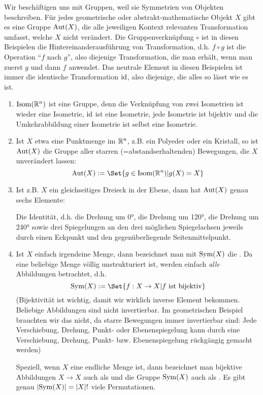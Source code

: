 \begin{example}[Symmetriegruppen]
Wir beschäftigen uns mit Gruppen, weil sie Symmetrien von Objekten beschreiben. Für jedes geometrische oder abstrakt-mathematische Objekt $X$ gibt es eine Gruppe $\operatorname{Aut}(X)$, die alle jeweiligen Kontext relevanten Transformation umfasst, welche $X$ nicht verändert. Die Gruppenverknüpfung $\circ$ ist in diesen Beispielen die Hintereinanderausführung von Transformation, d.h. $f\circ g$ ist die Operation \enquote{$f$ nach $g$}, also diejenige Transformation, die man erhält, wenn man zuerst $g$ und dann $f$ anwendet. Das neutrale Element in diesen Beispielen ist immer die identische Transformation $\operatorname{id}$, also diejenige, die alles so lässt wie es ist.

\begin{enumerate}
\item $\operatorname{Isom}(\mathbb{R}^n)$ ist eine Gruppe, denn die Verknüpfung von zwei Isometrien ist wieder eine Isometrie, $\operatorname{id}$ ist eine Isometrie, jede Isometrie ist bijektiv und die Umkehrabbildung einer Isometrie ist selbst eine Isometrie.
\item Ist $X$ etwa eine Punktmenge im $\mathbb{R}^n$, z.B. ein Polyeder oder ein Kristall, so ist $\operatorname{Aut}(X)$ die Gruppe aller starren (=abstandserhaltenden) Bewegungen, die $X$ unverändert lassen:
\[\Aut(X) := \Set{g\in\Isom(\IR^n) | g(X) = X}\]
\item Ist z.B. $X$ ein gleichseitiges Dreieck in der Ebene, dann hat $\operatorname{Aut}(X)$ genau sechs Elemente:

Die Identität, d.h. die Drehung um 0°, die Drehung um 120°, die Drehung um 240° sowie drei Spiegelungen an den drei möglichen Spiegelachsen jeweils durch einen Eckpunkt und den gegenüberliegende Seitenmittelpunkt.
\item Ist $X$ einfach irgendeine Menge, dann bezeichnet man mit $\operatorname{Sym}(X)$ die . Da eine beliebige Menge völlig unstrukturiert ist, werden einfach \emph{alle} Abbildungen betrachtet, d.h.
\[\Sym(X) := \Set{f: X\to X | f\text{ ist bijektiv}}\]
(Bijektivität ist wichtig, damit wir wirklich inverse Element bekommen. Beliebige Abbildungen sind nicht invertierbar. Im geometrischen Beispiel brauchten wir das nicht, da starre Bewegungen immer invertierbar sind: Jede Verschiebung, Drehung, Punkt- oder Ebenenspiegelung kann durch eine Verschiebung, Drehung, Punkt- bzw. Ebenenspiegelung rückgängig gemacht werden)

Speziell, wenn $X$ eine endliche Menge ist, dann bezeichnet man bijektive Abbildungen $X\to X$ auch als  und die Gruppe $\operatorname{Sym}(X)$ auch als . Es gibt genau $\lvert\operatorname{Sym}(X)\rvert = \lvert X\rvert!$ viele Permutationen.


\end{enumerate}
\end{example}
